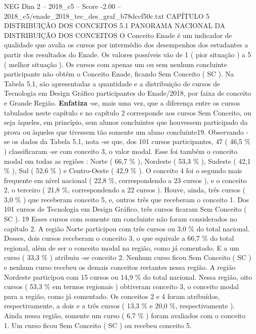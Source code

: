 \begin{textsample}{NEG Dim 2 – 2018\_c5 – Score -2.00 – 2018\_c5/enade\_2018\_tec\_des\_graf\_b78dccf50c.txt}  \label{ex:f2_neg_116}
CAPÍTULO 5 DISTRIBUIÇÃO DOS CONCEITOS 5.1 PANORAMA NACIONAL DA DISTRIBUIÇÃO DOS CONCEITOS O Conceito Enade é um indicador de qualidade que avalia os cursos por intermédio dos desempenhos dos estudantes a partir dos resultados do Enade.
Os valores possíveis vão de 1 ( pior situação ) a 5 ( melhor situação ).
Os cursos com apenas um ou sem nenhum concluinte participante não obtêm o Conceito Enade, ficando Sem Conceito ( SC ).
Na Tabela 5.1, são apresentadas a quantidade e a distribuição de cursos de Tecnologia em Design Gráfico participantes do Enade/2018, por faixa de conceito e Grande Região. \textbf{Enfatiza} -se, mais uma vez, que a diferença entre os cursos tabulados neste capítulo e no capítulo 2 corresponde aos cursos Sem Conceito, ou seja àqueles, em princípio, sem alunos concluintes que houvessem participado da prova ou àqueles que tivessem tão somente um aluno concluinte19.
Observando -se os dados da Tabela 5.1, nota -se que, dos 101 cursos participantes, 47 ( 46,5 \% ) classificaram -se com conceito 3, o valor modal.
Esse foi também o conceito modal em todas as regiões : Norte ( 66,7 \% ), Nordeste ( 53,3 \% ), Sudeste ( 42,1 \% ), Sul ( 52,6 \% ) e Centro-Oeste ( 42,9 \% ).
O conceito 4 foi o segundo mais frequente em nível nacional ( 22,8 \%, correspondendo a 23 cursos ), e o conceito 2, o terceiro ( 21,8 \%, correspondendo a 22 cursos ).
Houve, ainda, três cursos ( 3,0 \% ) que receberam conceito 5, e, outros três que receberam o conceito 1.
Dos 101 cursos de Tecnologia em Design Gráfico, três cursos ficaram Sem Conceito ( SC ). 19 Esses cursos com somente um concluinte não foram considerados no capítulo 2.
A região Norte participou com três cursos ou 3,0 \% do total nacional.
Desses, dois cursos receberam o conceito 3, o que equivale a 66,7 \% do total regional, além de ser o conceito modal na região, como já comentado.
E a um curso ( 33,3 \% ) atribuiu -se conceito 2.
Nenhum curso ficou Sem Conceito ( SC ) e nenhum curso recebeu os demais conceitos restantes nessa região.
A região Nordeste participou com 15 cursos ou 14,9 \% do total nacional.
Nessa região, oito cursos ( 53,3 \% em termos regionais ) obtiveram conceito 3, o conceito modal para a região, como já comentado.
Os conceitos 2 e 4 foram atribuídos, respectivamente, a dois e a três cursos ( 13,3 \% e 20,0 \%, respectivamente ).
Ainda nessa região, somente um curso ( 6,7 \% ) foram avaliados com o conceito 1.
Um curso ficou Sem Conceito ( SC ) ou recebeu conceito 5.

\end{textsample}
